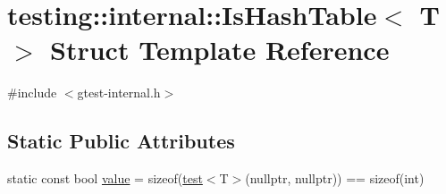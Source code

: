 \hypertarget{structtesting_1_1internal_1_1_is_hash_table}{}\section{testing\+::internal\+::Is\+Hash\+Table$<$ T $>$ Struct Template Reference}
\label{structtesting_1_1internal_1_1_is_hash_table}


{\ttfamily \#include $<$gtest-\/internal.\+h$>$}

\subsection*{Static Public Attributes}
\begin{DoxyCompactItemize}
\item 
static const bool \mbox{\hyperlink{structtesting_1_1internal_1_1_is_hash_table_a165e0a3eddfa5fadf9b950be6432d848}{value}} = sizeof(\mbox{\hyperlink{structtesting_1_1internal_1_1_is_hash_table_acc4d1e2307a1e0527932da7a7d354f06}{test}}$<$T$>$(nullptr, nullptr)) == sizeof(int)
\end{DoxyCompactItemize}
